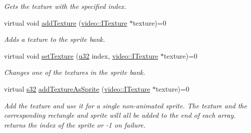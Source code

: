 \begin{DoxyCompactItemize}
\begin{DoxyCompactList}\small\item\em Gets the texture with the specified index. \end{DoxyCompactList}\item 
\mbox{\label{classirr_1_1gui_1_1IGUISpriteBank_abc01d1c9d72b66b78708e0ccf4ad423a}} 
virtual void \hyperlink{classirr_1_1gui_1_1IGUISpriteBank_abc01d1c9d72b66b78708e0ccf4ad423a}{add\+Texture} (\hyperlink{classirr_1_1video_1_1ITexture}{video\+::\+I\+Texture} $\ast$texture)=0
\begin{DoxyCompactList}\small\item\em Adds a texture to the sprite bank. \end{DoxyCompactList}\item 
\mbox{\label{classirr_1_1gui_1_1IGUISpriteBank_a1b174b898df47df5fd3b5dcb64e8c076}} 
virtual void \hyperlink{classirr_1_1gui_1_1IGUISpriteBank_a1b174b898df47df5fd3b5dcb64e8c076}{set\+Texture} (\hyperlink{namespaceirr_a0416a53257075833e7002efd0a18e804}{u32} index, \hyperlink{classirr_1_1video_1_1ITexture}{video\+::\+I\+Texture} $\ast$texture)=0
\begin{DoxyCompactList}\small\item\em Changes one of the textures in the sprite bank. \end{DoxyCompactList}\item 
\mbox{\label{classirr_1_1gui_1_1IGUISpriteBank_a6ce69269488db2357592cde11d1312bd}} 
virtual \hyperlink{namespaceirr_ac66849b7a6ed16e30ebede579f9b47c6}{s32} \hyperlink{classirr_1_1gui_1_1IGUISpriteBank_a6ce69269488db2357592cde11d1312bd}{add\+Texture\+As\+Sprite} (\hyperlink{classirr_1_1video_1_1ITexture}{video\+::\+I\+Texture} $\ast$texture)=0
\begin{DoxyCompactList}\small\item\em Add the texture and use it for a single non-\/animated sprite. The texture and the corresponding rectangle and sprite will all be added to the end of each array. returns the index of the sprite or -\/1 on failure. \end{DoxyCompactList}\item 
\mbox{\label{classirr_1_1gui_1_1IGUISpriteBank_a2305053e90c03ff274b637be23a5dd2a}} 

\end{DoxyCompactItemize}
